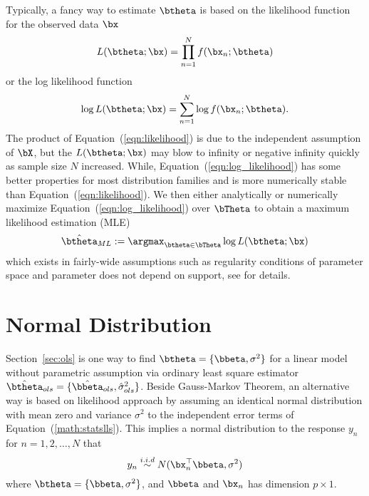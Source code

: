 Typically, a fancy way to estimate $\btheta$ is based on the
likelihood function for the observed data $\bx$
\begin{equation}
L(\btheta; \bx) = \prod_{n = 1}^N f(\bx_n; \btheta)
\label{eqn:likelihood}
\end{equation}
or the log likelihood function
\begin{equation}
\log L(\btheta; \bx) = \sum_{n = 1}^N \log f(\bx_n; \btheta).
\label{eqn:log_likelihood}
\end{equation}
The product of Equation~(\ref{eqn:likelihood}) is due to the independent
assumption of $\bX$, but the $L(\btheta; \bx)$ may blow to infinity
or negative infinity quickly as sample size $N$ increased. While,
Equation~(\ref{eqn:log_likelihood}) has some
better properties for most distribution families and
is more numerically stable than Equation~(\ref{eqn:likelihood}).
We then either analytically or numerically maximize
Equation~(\ref{eqn:log_likelihood})
over $\bTheta$ to obtain a maximum likelihood estimation
(MLE)
$$
  \hat{\btheta}_{ML} := \argmax_{\btheta\in\bTheta} \log L(\btheta; \bx)
$$
which exists in fairly-wide assumptions
such as regularity conditions of parameter space
and parameter does not depend on support,
see \citet{Casella2001} for details.




\section{Normal Distribution}
\label{sec:normal_distribution}

Section~\ref{sec:ols} is one way to find
$\btheta = \{\bbeta,\sigma^2\}$ for a linear model
without parametric assumption via ordinary least square estimator
$\hat{\btheta}_{ols} = \{\hat{\bbeta}_{ols},\hat{\sigma}_{ols}^2\}$.
Beside Gauss-Markov Theorem,
an alternative way is based on likelihood approach by
assuming an identical normal distribution with mean zero and
variance $\sigma^2$ to the independent error terms of
Equation~(\ref{math:statslls}).
This implies a normal distribution
to the response $y_n$ for $n=1,2,\ldots, N$ that
\begin{equation}
y_n \stackrel{i.i.d}{\sim} N(\bx_n^\top\bbeta, \sigma^2)
\label{eqn:normal}
\end{equation}
where $\btheta = \{\bbeta, \sigma^2\}$, and
$\bbeta$ and $\bx_n$ has dimension $p\times 1$.

